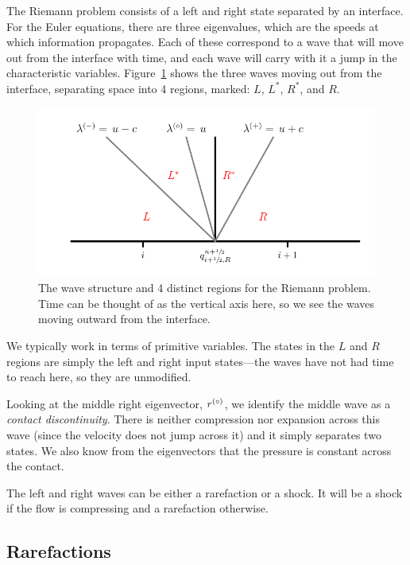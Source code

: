 The Riemann problem consists of a left and right state separated by an
interface.  For the Euler equations, there are three eigenvalues,
which are the speeds at which information propagates.  Each of these
correspond to a wave that will move out from the interface with time,
and each wave will carry with it a jump in the characteristic
variables.  Figure~\ref{fig:riemann:waves} shows the
three waves moving out from the interface, separating space into 4
regions, marked: $L$, $L^*$, $R^*$, and $R$.
\begin{figure}[h]
\centering
\includegraphics[width=\linewidth]{riemann-waves}
\caption[The Riemann problem wave structure for the Euler
  equations]{\label{fig:riemann:waves} The wave structure and 4
  distinct regions for the Riemann problem.  Time can be thought of as
  the vertical axis here, so we see the waves moving outward from the
  interface.}
\end{figure}
We typically work in terms of primitive variables.  The states in the
$L$ and $R$ regions are simply the left and right input states---the
waves have not had time to reach here, so they are unmodified.

Looking at the middle right eigenvector, $r^{(\circ)}$, we identify the
middle wave as a {\em contact discontinuity}.  There is neither
compression nor expansion across this wave (since the velocity does
not jump across it) and it simply separates two states.  We also know
from the eigenvectors that the pressure is constant across the
contact.

The left and right waves can be either a rarefaction or a shock.  It will
be a shock if the flow is compressing and a rarefaction otherwise.


\subsection{Rarefactions}

